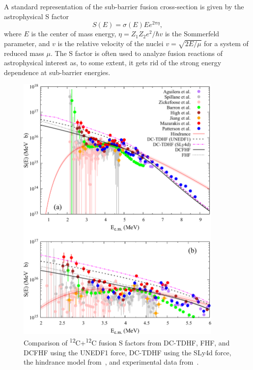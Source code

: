 A standard representation of the sub-barrier fusion cross-section is given by the astrophysical S factor 
\begin{equation}
S(E)=\sigma(E)Ee^{2\pi \eta},
\end{equation}
where $E$ is the center of mass energy, $\eta=Z_1Z_2e^2/\hbar v$ is the Sommerfeld parameter, and $v$ is the relative velocity of the nuclei $v=\sqrt{2E/\mu}$ for a system of reduced mass $\mu$.
The S factor is often used to analyze fusion reactions of astrophysical interest as, to some extent, it gets rid of the strong energy dependence at sub-barrier energies.

\begin{figure}
	\centering
	\includegraphics*[width=0.9\textwidth]{../Figures/CC/SFactors.pdf}
	\caption{Comparison of \textsuperscript{12}C+\textsuperscript{12}C fusion S factors from DC-TDHF, FHF, and DCFHF using the UNEDF1 force, DC-TDHF using the SLy4d force, the hindrance model from~\protect\citep{jiang2007}, and experimental data from~\protect\citep{aguilera2006,spillane2007,zickefoose2011,barron-palos2006,high1977,jiang2018,mazarakis1973,patterson1969}. }
	\label{fig:sfac}
\end{figure}

